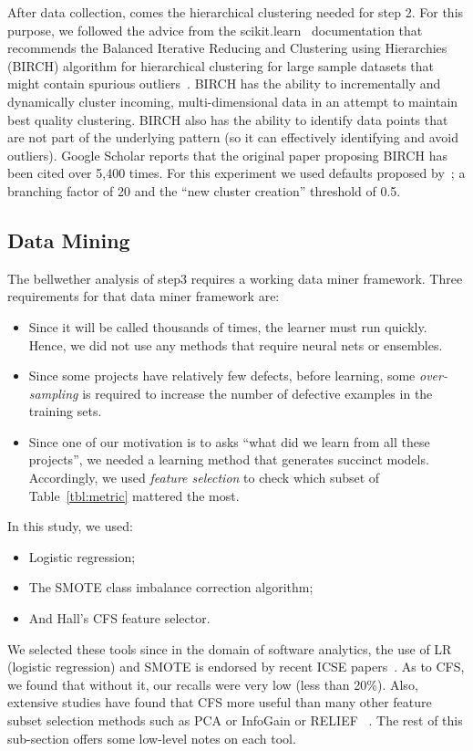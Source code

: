 \documentclass[10pt,journal,compsoc]{IEEEtran}
\newcommand{\bi}{\begin{itemize}}
\newcommand{\ei}{\end{itemize}}
\newcommand{\respto}[1]{
\fcolorbox{black}{black!15}{%
\label{resp:#1}%
\bf\scriptsize R{#1}}}
\begin{document}
 After data collection, comes  the  hierarchical clustering needed for step 2.
For this purpose, we followed the
advice from the scikit.learn~\cite{scikit-learn} documentation
that recommends the  Balanced Iterative Reducing and Clustering using Hierarchies  (BIRCH) algorithm for hierarchical
clustering for large sample datasets that might
contain spurious outliers~\cite{zhang1996birch}. 
BIRCH has the ability to incrementally and dynamically cluster incoming, multi-dimensional data in an attempt to maintain  best quality clustering. BIRCH also has the ability to identify data points that are not part of the underlying pattern (so it can effectively identifying and avoid outliers). 
 Google Scholar reports that  the original  paper proposing BIRCH has been cited over 5,400 times.
For this experiment we used defaults proposed by~\cite{zhang1996birch}; a   branching factor of 20 and  the ``new cluster creation'' threshold  of  0.5.

 



\subsection{Data Mining}\label{sec:dm}
The bellwether analysis of step3 requires a working data miner framework. Three requirements for that data miner framework are:
\bi
\item Since it will be called thousands of times, the learner must run quickly. Hence, we did not use any methods
that require  neural nets or ensembles. 
\item Since some projects have relatively few defects, before learning, 
some {\em over-sampling} is required to increase the number of defective examples in the training sets.
\item Since one of our motivation is to asks ``what did we learn from all these projects'', we needed a learning method that generates succinct models. Accordingly, we used {\em feature selection}  to check which subset of Table~\ref{tbl:metric}
mattered the most.
\ei
In this study, we used:
\bi
\item
Logistic regression;
\item
The SMOTE class imbalance correction algorithm;
\item
And Hall's CFS feature selector. 
\ei
We selected these tools
since   in the domain of software analytics,
the use of LR (logistic regression) and SMOTE
is endorsed by recent ICSE papers~\cite{Rahman:2013,ghotra2015revisiting,agrawal17}.
As to CFS, we found that without it, our recalls were very low (less than 20\%).
Also,   extensive studies have found that CFS more useful than many other feature subset selection methods such as  PCA or InfoGain or RELIEF\respto{1-5e} {\color{blue}~\cite{hall1999correlation,challagulla2008empirical,arar2015software,lee2016developer,rodriguez2007attribute,gao2015combining,hosni2017investigating}. }
The rest of this sub-section offers some low-level notes
on each tool.
\end{document}
